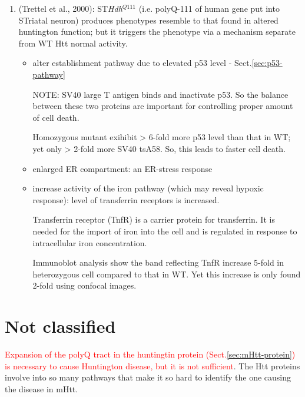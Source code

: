 \begin{enumerate}
  
  \item (Trettel et al., 2000): ST{\it Hdh}$^{Q111}$ (i.e. polyQ-111 of human
  gene put into STriatal neuron) produces phenotypes resemble to that found in
  altered huntington function; but it triggers the phenotype via a mechanism
  separate from WT Htt normal activity.
  
  \begin{itemize}
    \item alter establishment pathway due to elevated p53 level -
    Sect.\ref{sec:p53-pathway}

NOTE: SV40 large T antigen binds and inactivate p53. So the balance between
these two proteins are important for controlling proper amount of cell death.
    
Homozygous mutant exihibit > 6-fold more p53 level than that in WT; yet only >
2-fold more SV40 tsA58. So, this leads to faster cell death.

    
    \item enlarged ER compartment: an ER-stress response
    
    \item increase activity of the iron pathway (which may reveal hypoxic
    response): level of transferrin receptors is increased.
    
Transferrin receptor (TnfR) is a carrier protein for transferrin. It is needed
for the import of iron into the cell and is regulated in response to
intracellular iron concentration. 

Immunoblot analysis show the band reflecting TnfR increase 5-fold in
heterozygous cell compared to that in WT. Yet this increase is only found 2-fold
using confocal images.

    
    
  \end{itemize}
  
\end{enumerate}

\section{Not classified}	


\textcolor{red}{Expansion of the polyQ tract in the huntingtin protein
(Sect.\ref{sec:mHtt-protein}) is necessary to cause Huntington disease, but it
is not sufficient}. The Htt proteins involve into so many pathways that make it
so hard to identify the one causing the disease in mHtt.

